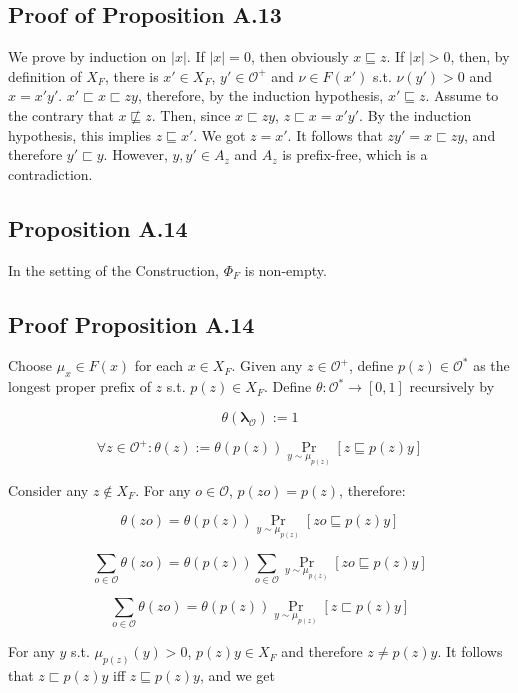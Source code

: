 \documentclass[a4paper]{article}
\DeclareMathOperator{\Prb}{Pr}
\newcommand{\Estr}{\boldsymbol{\lambda}}
\newcommand{\Abs}[1]{\lvert #1 \rvert}
\newcommand{\Obs}{\mathcal{O}}
\begin{document}
\subsection{Proof of Proposition A.13}

We prove by induction on ${\Abs{x}}$. If ${\Abs{x}=0}$, then obviously ${x \sqsubseteq z}$. If ${\Abs{x} > 0}$, then, by definition of ${X_F}$, there is ${x' \in X_F}$, ${y' \in \Obs^+}$ and ${\nu \in F(x')}$ s.t. ${\nu(y') > 0}$ and ${x = x'y'}$. ${x' \sqsubset x \sqsubset zy}$, therefore, by the induction hypothesis, ${x' \sqsubseteq z}$. Assume to the contrary that ${x \not\sqsubseteq z}$. Then, since ${x \sqsubset zy}$, ${z \sqsubset x = x'y'}$. By the induction hypothesis, this implies ${z \sqsubseteq x'}$. We got ${z = x'}$. It follows that ${zy' = x \sqsubset zy}$, and therefore ${y' \sqsubset y}$. However, ${y,y' \in A_z}$ and ${A_z}$ is prefix-free, which is a contradiction.

\subsection{Proposition A.14}

In the setting of the Construction, ${\Phi_F}$ is non-empty.

\subsection{Proof Proposition A.14}

Choose ${\mu_x \in F(x)}$ for each ${x \in X_F}$. Given any ${z \in \Obs^+}$, define ${p(z) \in \Obs^*}$ as the longest proper prefix of ${z}$ s.t. ${p(z) \in X_F}$. Define ${\theta: \Obs^* \rightarrow [0,1]}$ recursively by

$$\theta(\Estr_\Obs):=1$$

$$\forall z \in \Obs^+: \theta(z):=\theta(p(z)) \Prb_{y \sim \mu_{p(z)}}[z \sqsubseteq p(z)y]$$

Consider any ${z \not\in X_F}$. For any ${o \in \Obs}$, ${p(zo)=p(z)}$, therefore:

$$\theta(zo)=\theta(p(z))\Prb_{y \sim \mu_{p(z)}}[zo \sqsubseteq p(z)y]$$

$$\sum_{o \in \Obs} \theta(zo)=\theta(p(z)) \sum_{o \in \Obs} \Prb_{y \sim \mu_{p(z)}}[zo \sqsubseteq p(z)y]$$

$$\sum_{o \in \Obs} \theta(zo)=\theta(p(z)) \Prb_{y \sim \mu_{p(z)}}[z \sqsubset p(z)y]$$

For any ${y}$ s.t. ${\mu_{p(z)}(y) > 0}$, ${p(z)y \in X_F}$ and therefore ${z \ne p(z)y}$. It follows that ${z \sqsubset p(z)y}$ iff ${z \sqsubseteq p(z)y}$, and we get
\end{document}
